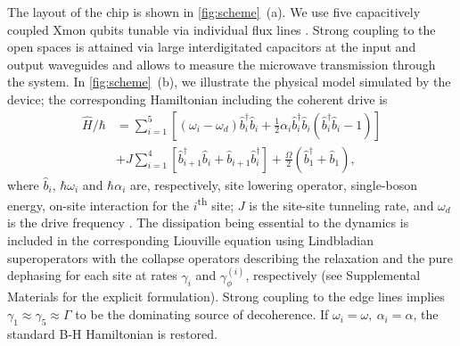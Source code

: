 \documentclass[%
 aps, prl,
 amsmath,amssymb,
 reprint,%
superscriptaddress
]{revtex4-2}
\begin{document}
The layout of the chip is shown in \autoref{fig:scheme}~(a). We use five capacitively coupled Xmon qubits tunable via individual flux lines \cite{ma2019dissipatively, li2018perfect}. Strong coupling to the open spaces is attained via large interdigitated capacitors at the input and output waveguides and allows to measure the microwave transmission through the system. In \autoref{fig:scheme}~(b), we illustrate the physical model simulated by the device; the corresponding Hamiltonian including the coherent drive is
\begin{equation}
\begin{aligned}
\hat H/\hbar &= \sum_{i=1}^5\left[ (\omega_i - \omega_d) \hat b^\dag_i \hat b_i + \frac{1}{2} \alpha_i \hat b_i^\dag \hat b_i (\hat b^\dag_i \hat b_i - 1)\right]\\
&+J\sum_{i=1}^4 \left[\hat b^\dag_{i+1} \hat b_i + \hat b_{i+1} \hat b_i^\dag\right]+\frac{\Omega}{2}(\hat b_1^\dag + \hat b_1),
\end{aligned}\label{eq:bose-hubbard}
\end{equation} 
where $\hat b_i$, $\hbar \omega_i$ and $\hbar\alpha_i$ are, respectively, site lowering operator, single-boson energy, on-site interaction for the $i$\textsuperscript{th} site; $J$ is the site-site tunneling rate, and $\omega_d$ is the drive frequency \cite{egorova2020analog, PhysRevA.102.013707, yanay2020two}. The dissipation being essential to the dynamics is included in the corresponding Liouville equation using Lindbladian superoperators  with the collapse operators describing the relaxation and the pure dephasing for each site at rates $\gamma_i$ and $\gamma_\phi^{(i)}$, respectively (see Supplemental Materials for the explicit formulation). Strong coupling to the edge lines implies $\gamma_1 \approx \gamma_5 \approx \Gamma$ to be the dominating source of decoherence. If $\omega_i = \omega,\ \alpha_i = \alpha$, the standard B-H Hamiltonian is restored.
\end{document}
